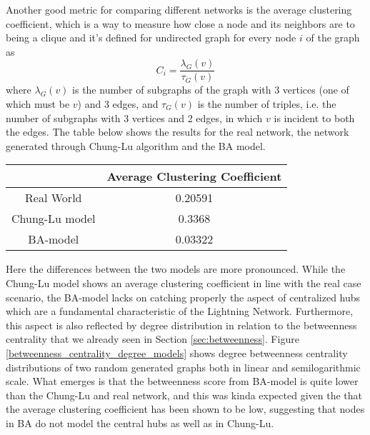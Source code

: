 	Another good metric for comparing different networks is the average clustering coefficient, which is a way to measure how close a node and its neighbors are to being a clique and it's defined for undirected graph for every node $i$ of the graph as $$C_i = \frac{\lambda_G(v)}{\tau_G(v)}$$ where $\lambda_G(v)$ is the number of subgraphs of the graph with 3 vertices (one of which must be $v$) and 3 edges, and $\tau_G(v)$ is the number of triples, i.e. the number of subgraphs with 3 vertices and 2 edges, in which $v$ is incident to both the edges. The table below shows the results for the real network, the network generated through Chung-Lu algorithm and the BA model.
	\begin{center}
		\begin{tabulary}{0.75\linewidth}{| C | C |}
			\hline
			& Average Clustering Coefficient \\ \hline
			Real World & 0.20591 \\ \hline
			Chung-Lu model & 0.3368 \\ \hline
			BA-model & 0.03322 \\
			\hline
		\end{tabulary}
	\end{center}

	Here the differences between the two models are more pronounced. While the Chung-Lu model shows an average clustering coefficient in line with the real case scenario, the BA-model lacks on catching properly the aspect of centralized hubs which are a fundamental characteristic of the Lightning Network. Furthermore, this aspect is also reflected by degree distribution in relation to the betweenness centrality that we already seen in Section \ref{sec:betweenness}. Figure \ref{betweenness_centrality_degree_models} shows degree betweenness centrality distributions of two random generated graphs both in linear and semilogarithmic scale. What emerges is that the betweenness score from BA-model is quite lower than the Chung-Lu and real network, and this was kinda expected given the that the average clustering coefficient has been shown to be low, suggesting that nodes in BA do not model the central hubs as well as in Chung-Lu.
	
